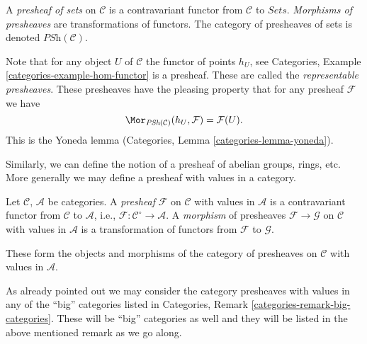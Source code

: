 \begin{definition}
\label{definition-presheaves-sets}
A {\it presheaf of sets} on $\mathcal{C}$ is a contravariant
functor from $\mathcal{C}$ to $\textit{Sets}$. {\it Morphisms
of presheaves} are transformations of functors. The category
of presheaves of sets is denoted $\textit{PSh}(\mathcal{C})$.
\end{definition}

\noindent
Note that for any object $U$ of $\mathcal{C}$ the functor of
points $h_U$, see Categories, Example \ref{categories-example-hom-functor}
is a presheaf. These are called the {\it representable presheaves}.
These presheaves have the pleasing property that for any
presheaf $\mathcal{F}$ we have
\begin{equation}
\label{equation-map-representable-into-presheaf}
\Mor_{\textit{PSh}(\mathcal{C})}(h_U, \mathcal{F})
=
\mathcal{F}(U).
\end{equation}
This is the Yoneda lemma (Categories, Lemma \ref{categories-lemma-yoneda}).

\medskip\noindent
Similarly, we can define the notion of a presheaf of abelian groups,
rings, etc. More generally we may define a presheaf with values in a
category.

\begin{definition}
\label{definition-presheaf}
Let $\mathcal{C}$, $\mathcal{A}$ be categories.
A {\it presheaf} $\mathcal{F}$ on $\mathcal{C}$
with values in $\mathcal{A}$ is a contravariant
functor from $\mathcal{C}$ to $\mathcal{A}$,
i.e., $\mathcal{F} : \mathcal{C}^\circ \to \mathcal{A}$.
A {\it morphism} of presheaves $\mathcal{F} \to \mathcal{G}$
on $\mathcal{C}$ with values in $\mathcal{A}$ is a transformation
of functors from $\mathcal{F}$ to $\mathcal{G}$.
\end{definition}

\noindent
These form the objects and morphisms of the category of presheaves
on $\mathcal{C}$ with values in $\mathcal{A}$.

\begin{remark}
\label{remark-big-presheaves}
As already pointed out we may consider the category
presheaves with values in any of the ``big'' categories
listed in Categories, Remark \ref{categories-remark-big-categories}.
These will be ``big'' categories as well and they will be
listed in the above mentioned remark as we go along.
\end{remark}
















